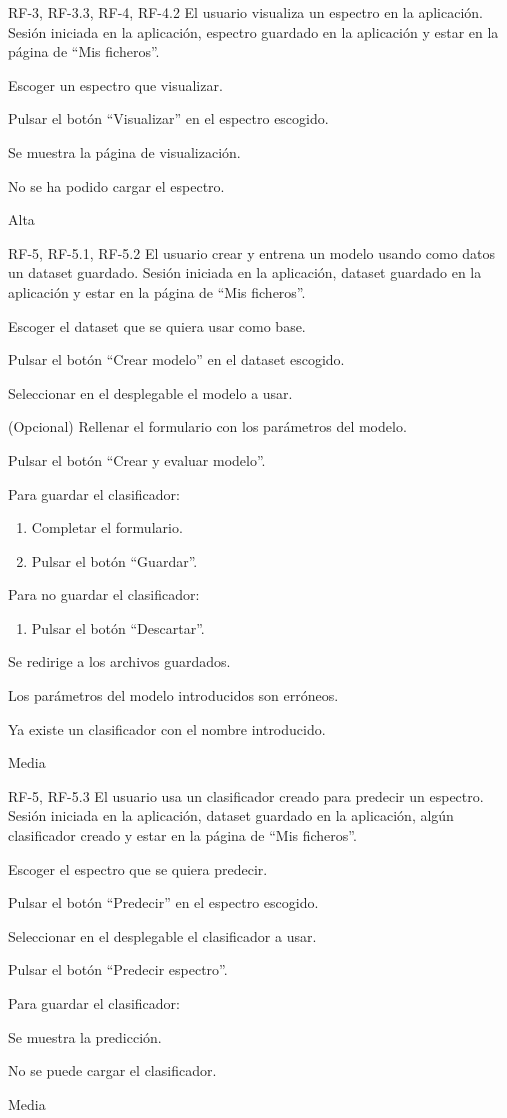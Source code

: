 {RF-3, RF-3.3, RF-4, RF-4.2}
{El usuario visualiza un espectro en la aplicación.}
{Sesión iniciada en la aplicación, espectro guardado en la aplicación y estar 
en la página de ``Mis ficheros''.}
{
	\item Escoger un espectro que visualizar.
	\item Pulsar el botón ``Visualizar'' en el espectro escogido.
}
{Se muestra la página de visualización.}
{	\item No se ha podido cargar el espectro.
}
{Alta}

{RF-5, RF-5.1, RF-5.2}
{El usuario crear y entrena un modelo usando como datos un dataset guardado.}
{Sesión iniciada en la aplicación, dataset guardado en la aplicación y estar en 
la página de ``Mis ficheros''.}
{
	\item Escoger el dataset que se quiera usar como base.
	\item Pulsar el botón ``Crear modelo'' en el dataset escogido.
	\item Seleccionar en el desplegable el modelo a usar.
	\item (Opcional) Rellenar el formulario con los parámetros del modelo.
	\item Pulsar el botón ``Crear y evaluar modelo''.
	\item Para guardar el clasificador:
	\begin{enumerate}
		\item Completar el formulario.
		\item Pulsar el botón ``Guardar''.
	\end{enumerate}
	\item Para no guardar el clasificador:
	\begin{enumerate}
		\item Pulsar el botón ``Descartar''.
	\end{enumerate}
}
{Se redirige a los archivos guardados.}
{	\item Los parámetros del modelo introducidos son erróneos.
	\item Ya existe un clasificador con el nombre introducido.
}
{Media}

{RF-5, RF-5.3}
{El usuario usa un clasificador creado para predecir un espectro.}
{Sesión iniciada en la aplicación, dataset guardado en la aplicación, algún 
clasificador creado y estar en la página de ``Mis ficheros''.}
{
	\item Escoger el espectro que se quiera predecir.
	\item Pulsar el botón ``Predecir'' en el espectro escogido.
	\item Seleccionar en el desplegable el clasificador a usar.
	\item Pulsar el botón ``Predecir espectro''.
	\item Para guardar el clasificador:
}
{Se muestra la predicción.}
{	\item No se puede cargar el clasificador.
}
{Media}